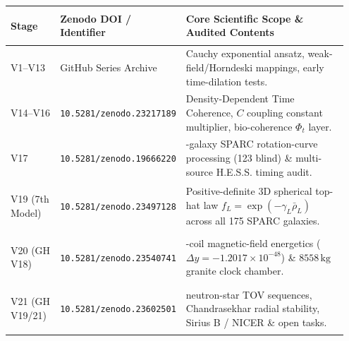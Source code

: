 \documentclass[10pt,a4paper]{article}
\begin{document}
{\vspace{1.5mm}
\begin{center}\vspace{-2pt}
{\footnotesize
\begin{tabular}{@{}>{\bfseries\raggedright\arraybackslash}p{0.15\linewidth}>{\raggedright\arraybackslash}p{0.27\linewidth}>{\raggedright\arraybackslash}p{0.53\linewidth}@{}}
\toprule
Stage & Zenodo DOI / Identifier & Core Scientific Scope \& Audited Contents \\
\midrule
V1--V13 & GitHub Series Archive & Cauchy exponential ansatz, weak-field/Horndeski mappings, early time-dilation tests. \\
V14--V16 & \texttt{10.5281/zenodo.23217189} & Density-Dependent Time Coherence, $C$ coupling constant multiplier, bio-coherence $\Phi_t$ layer. \\
V17 & \texttt{10.5281/zenodo.19666220} & 155-galaxy SPARC rotation-curve processing (123 blind) \& multi-source H.E.S.S. timing audit. \\
V19 (7th Model) & \texttt{10.5281/zenodo.23497128} & Positive-definite 3D spherical top-hat law $f_L=\exp(-\gamma_L\bar{\rho}_L)$ across all 175 SPARC galaxies. \\
V20 (GH V18) & \texttt{10.5281/zenodo.23540741} & 8-coil magnetic-field energetics ($\Delta y=-1.2017\times 10^{-48}$) \& $8558\,\text{kg}$ granite clock chamber. \\
V21 (GH V19/21) & \texttt{10.5281/zenodo.23602501} & 33 neutron-star TOV sequences, Chandrasekhar radial stability, Sirius B / NICER \& open tasks. \\
\bottomrule
\end{tabular}}
\end{center}

}
\end{document}
